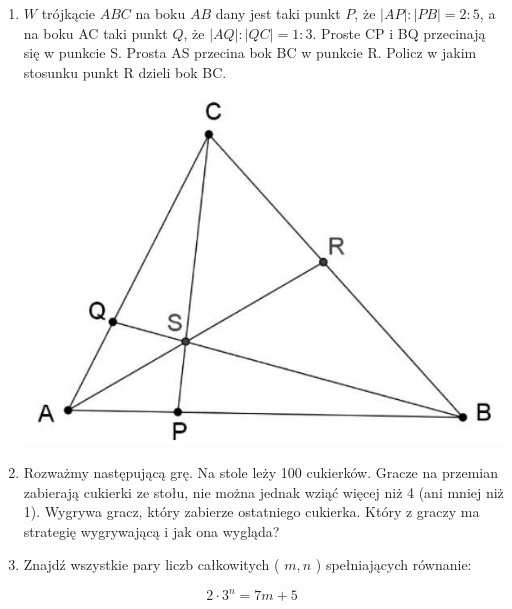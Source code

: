 \documentclass[10pt]{article}
\begin{document}
\begin{enumerate}
  \item \(W\) trójkącie \(A B C\) na boku \(A B\) dany jest taki punkt \(P\), że \(|A P|:|P B|=2: 5\), a na boku AC taki punkt \(Q\), że \(|A Q|:|Q C|=1: 3\). Proste CP i BQ przecinają się w punkcie S. Prosta AS przecina bok BC w punkcie R. Policz w jakim stosunku punkt R dzieli bok BC.\\
\includegraphics[max width=\textwidth, center]{2024_11_21_bfc1683a10266ed24de7g-1}
  \item Rozważmy następującą grę. Na stole leży 100 cukierków. Gracze na przemian zabierają cukierki ze stołu, nie można jednak wziąć więcej niż 4 (ani mniej niż 1). Wygrywa gracz, który zabierze ostatniego cukierka. Który z graczy ma strategię wygrywającą i jak ona wygląda?
  \item Znajdź wszystkie pary liczb całkowitych ( \(m, n\) ) spełniających równanie:
\end{enumerate}

\[
2 \cdot 3^{n}=7 m+5
\]
\end{document}
